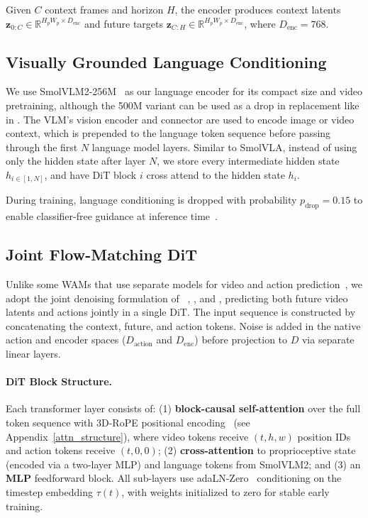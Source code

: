 Given $C$ context frames and horizon $H$, the encoder produces context latents $\mathbf{z}_{0:C} \in \mathbb{R}^{H_p W_p \times D_{\text{enc}}}$ and future targets $\mathbf{z}_{C:H} \in \mathbb{R}^{H_p W_p \times D_{\text{enc}}}$, where $D_{\text{enc}} = 768$.


\subsection{Visually Grounded Language Conditioning}

We use SmolVLM2-256M~\cite{SmolVLM2, SmolVLA} as our language encoder for its compact size and video pretraining, although the 500M variant can be used as a drop in replacement like in \citet{SmolVLA}. The VLM's vision encoder and connector are used to encode image or video context, which is prepended to the language token sequence before passing through the first $N$ language model layers. Similar to SmolVLA, instead of using only the hidden state after layer $N$, we store every intermediate hidden state $h_{i \in [1, N]}$, and have DiT block $i$ cross attend to the hidden state $h_i$.

During training, language conditioning is dropped with probability $p_{\text{drop}} = 0.15$ to enable classifier-free guidance at inference time~\cite{DreamZero}.


\subsection{Joint Flow-Matching DiT}

Unlike some WAMs that use separate models for video and action prediction~\cite{MimicVideo, VLAJEPA, TRIWAM}, we adopt the joint denoising formulation of ~\citet{DreamZero}, \citet{UWM}, and \citet{CosmosPolicy},  predicting both future video latents and actions jointly in a single DiT. The input sequence is constructed by concatenating the context, future, and action tokens. Noise is added in the native action and encoder spaces ($D_{\text{action}}$ and $D_{\text{enc}}$) before projection to $D$ via separate linear layers.

\paragraph{DiT Block Structure.}
Each transformer layer consists of: (1) \textbf{block-causal self-attention} over the full token sequence with 3D-RoPE positional encoding~\cite{ThreeDRoPE, DreamZero, vjepa2_1} (see Appendix~\ref{attn_structure}), where video tokens receive $(t, h, w)$ position IDs and action tokens receive $(t, 0, 0)$; (2) \textbf{cross-attention} to proprioceptive state (encoded via a two-layer MLP) and language tokens from SmolVLM2; and (3) an \textbf{MLP} feedforward block. All sub-layers use adaLN-Zero~\citep{DiT} conditioning on the timestep embedding $\tau(t)$, with weights initialized to zero for stable early training.

